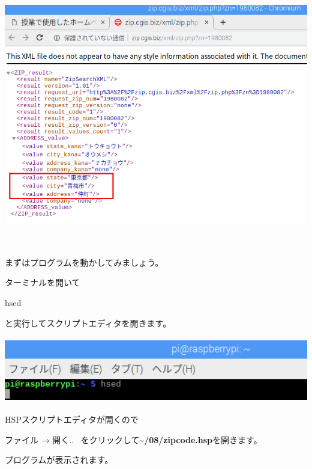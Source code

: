 \documentclass[a4paper,12pt,dvipdfmx]{jarticle}
\begin{document}
\begin{center}
\includegraphics[width=15.492cm,height=11.515cm]{textbook-img055.png}

\end{center}
\clearpage
まずはプログラムを動かしてみましょう。

ターミナルを開いて

hsed

と実行してスクリプトエディタを開きます。



\begin{center}
\includegraphics[width=17.057cm,height=2.866cm]{textbook-img013.png}

\end{center}
HSPスクリプトエディタが開くので

ファイル → 開く..
\ をクリックして\textbf{\~{}/08/zipcode.hsp}を開きます。

プログラムが表示されます。
\end{document}
